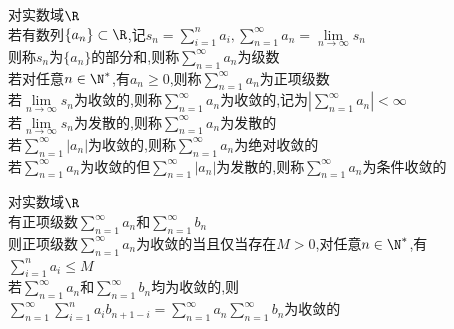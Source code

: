 \begin{dingyi}
对实数域$\R$\\
若有数列$\{a_n\}\subset \R$,记$s_n=\sum\limits_{i=1}^{n}a_i,\sum\limits_{n=1}^{\infty}a_n=\lim\limits_{n\to\infty}s_n$\\
则称$s_n$为$\{a_n\}$的部分和,则称$\sum\limits_{n=1}^{\infty}a_n$为级数\\
若对任意$n\in\N^*$,有$a_n\geq 0$,则称$\sum\limits_{n=1}^{\infty}a_n$为正项级数\\
若$\lim\limits_{n\to\infty}s_n$为收敛的,则称$\sum\limits_{n=1}^{\infty}a_n$为收敛的,记为$|\sum\limits_{n=1}^{\infty}a_n|<\infty$\\
若$\lim\limits_{n\to\infty}s_n$为发散的,则称$\sum\limits_{n=1}^{\infty}a_n$为发散的\\
若$\sum\limits_{n=1}^{\infty}|a_n|$为收敛的,则称$\sum\limits_{n=1}^{\infty}a_n$为绝对收敛的\\
若$\sum\limits_{n=1}^{\infty}a_n$为收敛的但$\sum\limits_{n=1}^{\infty}|a_n|$为发散的,则称$\sum\limits_{n=1}^{\infty}a_n$为条件收敛的
\end{dingyi}

\begin{dingli}
对实数域$\R$\\
有正项级数$\sum\limits_{n=1}^{\infty}a_n$和$\sum\limits_{n=1}^{\infty}b_n$\\
则正项级数$\sum\limits_{n=1}^{\infty}a_n$为收敛的当且仅当存在$M>0$,对任意$n\in\N^*$,有$\sum\limits_{i=1}^{n}a_i\leq M$\\
若$\sum\limits_{n=1}^{\infty}a_n$和$\sum\limits_{n=1}^{\infty}b_n$均为收敛的,则$\sum\limits_{n=1}^{\infty}\sum\limits_{i=1}^{n}a_{i}b_{n+1-i}=\sum\limits_{n=1}^{\infty}a_n\sum\limits_{n=1}^{\infty}b_n$为收敛的
\end{dingli}

